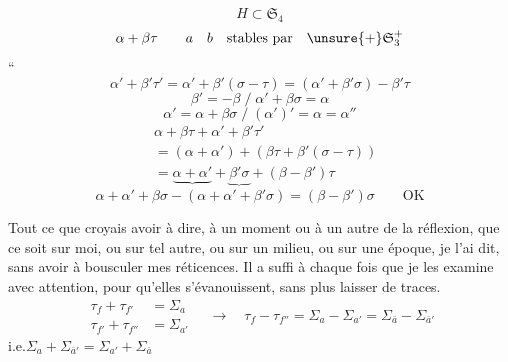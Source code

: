 \[H\subset\mathfrak S_4\]
\[\alpha+\beta\tau\qquad a\quad b\quad\text{stables par}\quad\unsure{+}\mathfrak S_3^+\]
``
\[\alpha'+\beta'\tau'=\alpha'+\beta'(\sigma-\tau)
 =(\alpha'+\beta'\sigma)-\beta'\tau\]
\[\beta'=-\beta\;/\;\alpha'+\beta\sigma=\alpha\]
\[\alpha'=\alpha+\beta\sigma\;/\;(\alpha')'=\alpha=\alpha''\]
\[
\begin{aligned}
&\alpha+\beta\tau+\alpha'+\beta'\tau'\\
&=(\alpha+\alpha')+(\beta\tau+\beta'(\sigma-\tau))\\
&=\underbrace{\alpha+\alpha'}+\underbrace{\beta'\sigma}+(\beta-\beta')\tau
\end{aligned}
\]
\[\alpha+\alpha'+\beta\sigma-(\alpha+\alpha'+\beta'\sigma)
 =(\beta-\beta')\sigma\qquad\text{OK}\]

Tout ce que  croyais avoir à dire, à un moment ou à un autre
de la réflexion, \inserted{(}que ce soit sur moi, ou sur tel autre, ou sur un milieu,
ou sur une époque, je l'ai dit, sans avoir à bousculer mes réticences.
Il a suffi à chaque fois que je les examine avec attention, pour qu'elles s'évanouissent,
sans plus laisser de traces.
\[
\begin{aligned}\tau_f+\tau_{f'}&=\Sigma_a\\\tau_{f'}+\tau_{f''}&=\Sigma_{a'}\end{aligned}
\quad\longrightarrow\quad
\tau_f-\tau_{f''}=\Sigma_a-\Sigma_{a'}=\Sigma_{\bar a}-\Sigma_{\bar a'}
\]
i.e.\quad $\Sigma_a+\Sigma_{\bar a'}=\Sigma_{a'}+\Sigma_{\bar a}$


